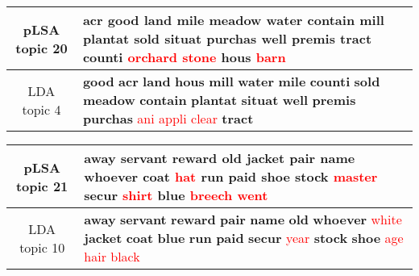 \begin{center}\begin{tabularx}{\textwidth} {
  | c | >{\raggedright\arraybackslash}X | } \hline 
pLSA topic 20 & \textbf{acr} \textbf{good} \textbf{land} \textbf{mile} \textbf{meadow} \textbf{water} \textbf{contain} \textbf{mill} \textbf{plantat} \textbf{sold} \textbf{situat} \textbf{purchas} \textbf{well} \textbf{premis} \textbf{tract} \textbf{counti} \textcolor{red}{orchard} \textcolor{red}{stone} \textbf{hous} \textcolor{red}{barn} \\ \hline 
LDA topic 4 & \textbf{good} \textbf{acr} \textbf{land} \textbf{hous} \textbf{mill} \textbf{water} \textbf{mile} \textbf{counti} \textbf{sold} \textbf{meadow} \textbf{contain} \textbf{plantat} \textbf{situat} \textbf{well} \textbf{premis} \textbf{purchas} \textcolor{red}{ani} \textcolor{red}{appli} \textcolor{red}{clear} \textbf{tract} \\ \hline 
\end{tabularx}

\end{center}

\begin{center}\begin{tabularx}{\textwidth} {
  | c | >{\raggedright\arraybackslash}X | } \hline 
pLSA topic 21 & \textbf{away} \textbf{servant} \textbf{reward} \textbf{old} \textbf{jacket} \textbf{pair} \textbf{name} \textbf{whoever} \textbf{coat} \textcolor{red}{hat} \textbf{run} \textbf{paid} \textbf{shoe} \textbf{stock} \textcolor{red}{master} \textbf{secur} \textcolor{red}{shirt} \textbf{blue} \textcolor{red}{breech} \textcolor{red}{went} \\ \hline 
LDA topic 10 & \textbf{away} \textbf{servant} \textbf{reward} \textbf{pair} \textbf{name} \textbf{old} \textbf{whoever} \textcolor{red}{white} \textbf{jacket} \textbf{coat} \textbf{blue} \textbf{run} \textbf{paid} \textbf{secur} \textcolor{red}{year} \textbf{stock} \textbf{shoe} \textcolor{red}{age} \textcolor{red}{hair} \textcolor{red}{black} \\ \hline 
\end{tabularx}

\end{center}

